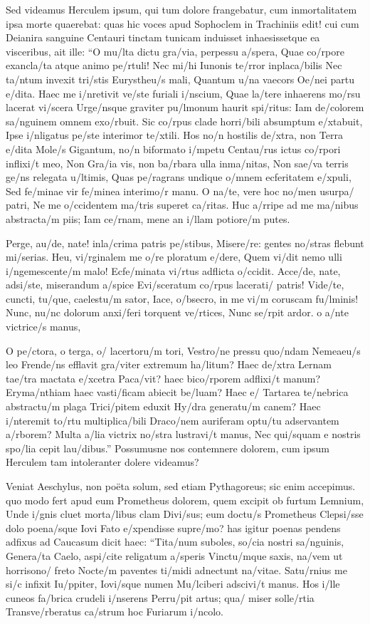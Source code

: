  Sed videamus Herculem ipsum, qui tum dolore frangebatur, cum inmortalitatem ipsa morte quaerebat: quas hic voces apud Sophoclem in Trachiniis edit! cui cum Deianira sanguine Centauri tinctam tunicam induisset inhaesissetque ea visceribus, ait ille: ``O mu/lta dictu gra/via, perpessu a/spera, Quae co/rpore exancla/ta atque animo pe/rtuli! Nec mi/hi Iunonis te/rror inplaca/bilis Nec ta/ntum invexit tri/stis Eurystheu/s mali, Quantum u/na vaecors Oe/nei partu e/dita. Haec me i/nretivit ve/ste furiali i/nscium, Quae la/tere inhaerens mo/rsu lacerat vi/scera Urge/nsque graviter pu/lmonum haurit spi/ritus: Iam de/colorem sa/nguinem omnem exo/rbuit. Sic co/rpus clade horri/bili absumptum e/xtabuit, Ipse i/nligatus pe/ste interimor te/xtili. Hos no/n hostilis de/xtra, non Terra e/dita Mole/s Gigantum, no/n biformato i/mpetu Centau/rus ictus co/rpori inflixi/t meo, Non Gra/ia vis, non ba/rbara ulla inma/nitas, Non sae/va terris ge/ns relegata u/ltimis, Quas pe/ragrans undique o/mnem ecferitatem e/xpuli, Sed fe/minae vir fe/minea interimo/r manu. O na/te, vere hoc no/men usurpa/ patri, Ne me o/ccidentem ma/tris superet ca/ritas. Huc a/rripe ad me ma/nibus abstracta/m piis; Iam ce/rnam, mene an i/llam potiore/m putes.

 Perge, au/de, nate! inla/crima patris pe/stibus, Misere/re: gentes no/stras flebunt mi/serias. Heu, vi/rginalem me o/re ploratum e/dere, Quem vi/dit nemo ulli i/ngemescente/m malo! Ecfe/minata vi/rtus adflicta o/ccidit. Acce/de, nate, adsi/ste, miserandum a/spice Evi/sceratum co/rpus lacerati/ patris! Vide/te, cuncti, tu/que, caelestu/m sator, Iace, o/bsecro, in me vi/m coruscam fu/lminis! Nunc, nu/nc dolorum anxi/feri torquent ve/rtices, Nunc se/rpit ardor. o a/nte victrice/s manus,

 O pe/ctora, o terga, o/ lacertoru/m tori, Vestro/ne pressu quo/ndam Nemeaeu/s leo Frende/ns efflavit gra/viter extremum ha/litum? Haec de/xtra Lernam tae/tra mactata e/xcetra Paca/vit? haec bico/rporem adflixi/t manum? Eryma/nthiam haec vasti/ficam abiecit be/luam? Haec e/ Tartarea te/nebrica abstractu/m plaga Trici/pitem eduxit Hy/dra generatu/m canem? Haec i/nteremit to/rtu multiplica/bili Draco/nem auriferam optu/tu adservantem a/rborem? Multa a/lia victrix no/stra lustravi/t manus, Nec qui/squam e nostris spo/lia cepit lau/dibus.'' Possumusne nos contemnere dolorem, cum ipsum Herculem tam intoleranter dolere videamus?

 Veniat Aeschylus, non poëta solum, sed etiam Pythagoreus; sic enim accepimus. quo modo fert apud eum Prometheus dolorem, quem excipit ob furtum Lemnium, Unde i/gnis cluet morta/libus clam Divi/sus; eum doctu/s Prometheus Clepsi/sse dolo poena/sque Iovi Fato e/xpendisse supre/mo? has igitur poenas pendens adfixus ad Caucasum dicit haec: ``Tita/num suboles, so/cia nostri sa/nguinis, Genera/ta Caelo, aspi/cite religatum a/speris Vinctu/mque saxis, na/vem ut horrisono/ freto Nocte/m paventes ti/midi adnectunt na/vitae. Satu/rnius me si/c infixit Iu/ppiter, Iovi/sque numen Mu/lciberi adscivi/t manus. Hos i/lle cuneos fa/brica crudeli i/nserens Perru/pit artus; qua/ miser solle/rtia Transve/rberatus ca/strum hoc Furiarum i/ncolo.

